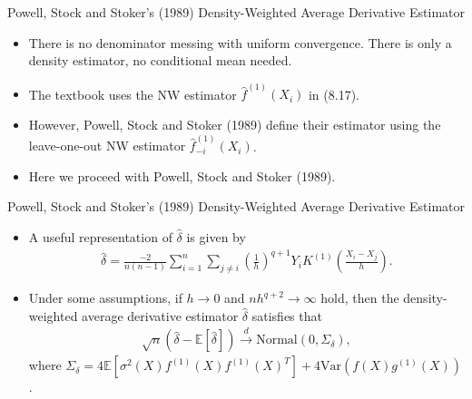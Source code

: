 \documentclass[xcolor=svgnames,dvipdfmx,cjk]{beamer}
\theoremstyle{example}
\def\Var{\text{Var}}
\def\E{\mathbb{E}}
\def\darrow{\xrightarrow{d}}
\begin{document}
\begin{frame}{Powell, Stock and Stoker's (1989) Density-Weighted Average Derivative Estimator}
\begin{itemize}
  \item There is \alert{no denominator messing with uniform convergence}. 
        There is only a density estimator, no conditional mean needed.
  \item The textbook uses the NW estimator $\hat{f}^{(1)}(X_i)$ in (8.17). 
  \item However, \alert{Powell, Stock and Stoker (1989) define their estimator 
        using the leave-one-out NW estimator $\hat{f}_{-i}^{(1)}(X_i)$}.
  \item Here we proceed with Powell, Stock and Stoker (1989).
\end{itemize}
\end{frame}
  
  
\begin{frame}{Powell, Stock and Stoker's (1989) Density-Weighted Average Derivative Estimator}
\begin{itemize}
  \item A useful representation of $\hat{\delta}$ is given by 
        \begin{align*}
          \hat{\delta} 
            = \frac{-2}{n(n-1)}
              \sum_{i=1}^{n} \sum_{j \neq i}
              \left( \frac{1}{h} \right)^{q+1}
              Y_i K^{(1)} \left( \frac{X_i - X_j}{h} \right).
        \end{align*}
  \item Under some assumptions, 
        if $h \to 0$ and $nh^{q+2} \to \infty$ hold,
        then the density-weighted average derivative estimator $\hat{\delta}$ satisfies that 
        \begin{align*}
          \sqrt{n} (\hat{\delta} - \E[\hat{\delta}]) \darrow \text{Normal}(0, \Sigma_{\delta}),
        \end{align*}
        where $\Sigma_{\delta} = 4\E[\sigma^2(X) f^{(1)}(X) f^{(1)}(X)^T] + 4 \Var( f(X) g^{(1)}(X))$. 
\end{itemize}  
\end{frame}
\end{document}
